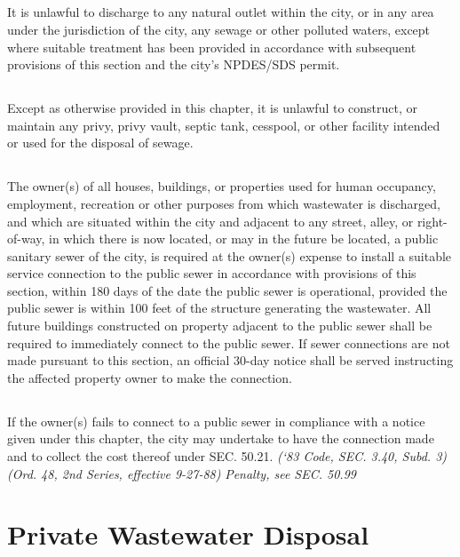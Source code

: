 \documentclass[code.tex]{subfiles}
\begin{document}
\subsection{}
It is unlawful to discharge to any natural outlet within the city, or in any area under the jurisdiction of the city, any sewage or other polluted waters, except where suitable treatment has been provided in accordance with subsequent provisions of this section and the city’s NPDES/SDS permit.
\subsection{}
Except as otherwise provided in this chapter, it is unlawful to construct, or maintain any privy, privy vault, septic tank, cesspool, or other facility intended or used for the disposal of sewage.
\subsection{}
The owner(s) of all houses, buildings, or properties used for human occupancy, employment, recreation or other purposes from which wastewater is discharged, and which are situated within the city and adjacent to any street, alley, or right-of-way, in which there is now located, or may in the future be located, a public sanitary sewer of the city, is required at the owner(s) expense to install a suitable service connection to the public sewer in accordance with provisions of this section, within 180 days of the date the public sewer is operational, provided the public sewer is within 100 feet of the structure generating the wastewater.  All future buildings constructed on property adjacent to the public sewer shall be required to immediately connect to the public sewer.  If sewer connections are not made pursuant to this section, an official 30-day notice shall be served instructing the affected property owner to make the connection.
\subsection{}
If the owner(s) fails to connect to a public sewer in compliance with a notice given under this chapter, the city may undertake to have the connection made and to collect the cost thereof under SEC. 50.21.\newline
\emph{(‘83 Code, SEC. 3.40, Subd. 3) (Ord. 48, 2nd Series, effective 9-27-88)}\newline
\emph{Penalty, see SEC. 50.99}
\section{Private Wastewater Disposal}
\end{document}
